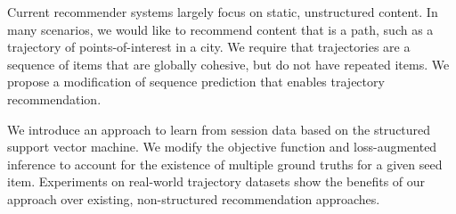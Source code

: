 
Current recommender systems largely focus on static, unstructured content.
In many scenarios, we would like to recommend content that is a path,
such as a trajectory of points-of-interest in a city.
We require that trajectories are a sequence of items that are globally cohesive, but
do not have repeated items. We propose a modification of sequence prediction
that enables trajectory recommendation.

We introduce an approach to learn from session data based on the structured support vector machine.
We modify the objective function and loss-augmented inference to account for the existence of multiple ground truths for a given seed item.
Experiments on real-world trajectory datasets show the benefits of our approach over existing, non-structured recommendation approaches.
